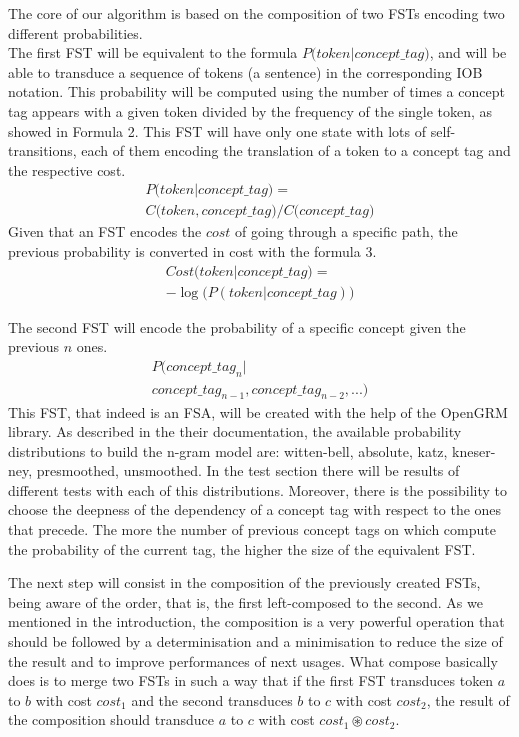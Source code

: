 \documentclass[11pt,a4paper]{article}
\begin{document}
The core of our algorithm is based on the composition of two FSTs encoding two different probabilities.\\
The first FST will be equivalent to the formula $ P \big( token \big | concept\_tag ) $, and will be able to transduce a sequence of tokens (a sentence) in the corresponding IOB notation. This probability will be computed using the number of times a concept tag appears with a given token divided by the frequency of the single token, as showed in Formula 2. This FST will have only one state with lots of self-transitions, each of them encoding the translation of a token to a concept tag and the respective cost.
\begin{multline}
P \big( token | concept\_tag \big) = \\
C \big( token,concept\_tag \big) / C \big( concept\_tag \big)
\end{multline}
Given that an FST encodes the $cost$ of going through a specific path, the previous probability is converted in cost with the formula 3.
\begin{multline}
Cost \big( token | concept\_tag \big) = \\
- \log\big(P ( token | concept\_tag )\big)
\end{multline}

The second FST will encode the probability of a specific concept given the previous $n$ ones.
\begin{multline}
P \big( concept\_tag_n | \\
 concept\_tag_{n-1}, concept\_tag_{n-2}, ... \big)
\end{multline}
This FST, that indeed is an FSA, will be created with the help of the OpenGRM library. As described in the their documentation, the available probability distributions to build the n-gram model are: witten-bell, absolute, katz, kneser-ney, presmoothed, unsmoothed. In the test section there will be results of different tests with each of this distributions. Moreover, there is the possibility to choose the deepness of the dependency of a concept tag with respect to the ones that precede. The more the number of previous concept tags on which compute the probability of the current tag, the higher the size of the equivalent FST.

The next step will consist in the composition of the previously created FSTs, being aware of the order, that is, the first left-composed to the second. As we mentioned in the introduction, the composition is a very powerful operation that should be followed by a determinisation and a minimisation to reduce the size of the result and to improve performances of next usages. What compose basically does is to merge two FSTs in such a way that if the first FST transduces token $a$ to $b$ with cost $cost_1$ and the second transduces $b$ to $c$ with cost $cost_2$, the result of the composition should transduce $a$ to $c$ with cost $ cost_1 \circledast cost_2 $.
\end{document}

